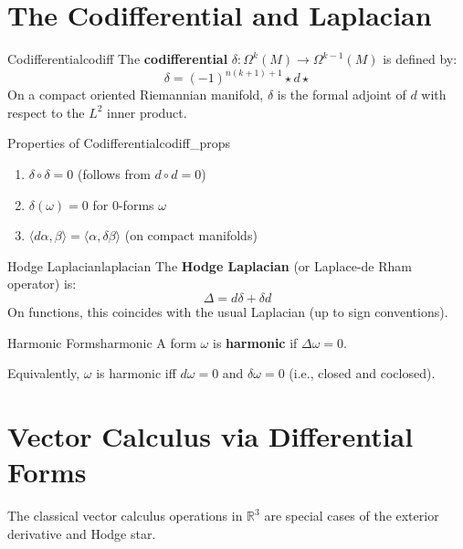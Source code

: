 \documentclass[11pt, letterpaper, openany]{book}
\begin{document}
\section{The Codifferential and Laplacian}

\begin{defn}{Codifferential}{codiff}
The \textbf{codifferential} $\delta: \Omega^k(M) \to \Omega^{k-1}(M)$ is defined by:
\[\delta = (-1)^{n(k+1)+1} \star d \star\]
On a compact oriented Riemannian manifold, $\delta$ is the formal adjoint of $d$ with respect to the $L^2$ inner product.
\end{defn}

\begin{thm}{Properties of Codifferential}{codiff_props}
\begin{enumerate}
    \item $\delta \circ \delta = 0$ (follows from $d \circ d = 0$)
    \item $\delta(\omega) = 0$ for 0-forms $\omega$
    \item $\langle d\alpha, \beta \rangle = \langle \alpha, \delta\beta \rangle$ (on compact manifolds)
\end{enumerate}
\end{thm}

\begin{defn}{Hodge Laplacian}{laplacian}
The \textbf{Hodge Laplacian} (or Laplace-de Rham operator) is:
\[\Delta = d\delta + \delta d\]
On functions, this coincides with the usual Laplacian (up to sign conventions).
\end{defn}

\begin{defn}{Harmonic Forms}{harmonic}
A form $\omega$ is \textbf{harmonic} if $\Delta \omega = 0$.

Equivalently, $\omega$ is harmonic iff $d\omega = 0$ and $\delta\omega = 0$ (i.e., closed and coclosed).
\end{defn}

\section{Vector Calculus via Differential Forms}

The classical vector calculus operations in $\mathbb{R}^3$ are special cases of the exterior derivative and Hodge star.
\end{document}
